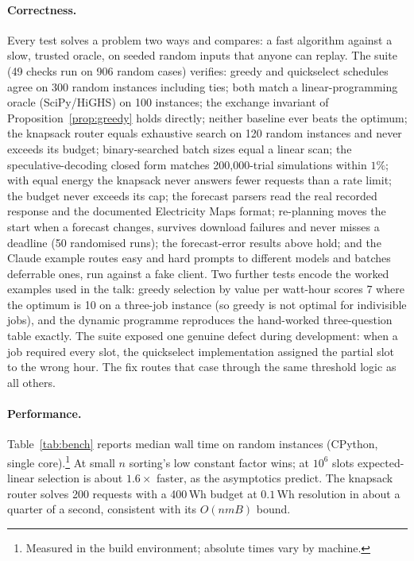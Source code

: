 \documentclass[11pt]{article}
\theoremstyle{definition}
\theoremstyle{remark}
\begin{document}
\paragraph{Correctness.} Every test solves a problem two ways and compares: a fast algorithm against a slow, trusted oracle, on seeded random inputs that anyone can replay. The suite (49 checks run on 906 random cases) verifies: greedy and quickselect schedules agree on 300 random instances including ties; both match a linear-programming oracle (SciPy/HiGHS) on 100 instances; the exchange invariant of Proposition~\ref{prop:greedy} holds directly; neither baseline ever beats the optimum; the knapsack router equals exhaustive search on 120 random instances and never exceeds its budget; binary-searched batch sizes equal a linear scan; the speculative-decoding closed form matches 200{,}000-trial simulations within $1\%$; with equal energy the knapsack never answers fewer requests than a rate limit; the budget never exceeds its cap; the forecast parsers read the real recorded response and the documented Electricity Maps format; re-planning moves the start when a forecast changes, survives download failures and never misses a deadline (50 randomised runs); the forecast-error results above hold; and the Claude example routes easy and hard prompts to different models and batches deferrable ones, run against a fake client. Two further tests encode the worked examples used in the talk: greedy selection by value per watt-hour scores 7 where the optimum is 10 on a three-job instance (so greedy is not optimal for indivisible jobs), and the dynamic programme reproduces the hand-worked three-question table exactly. The suite exposed one genuine defect during development: when a job required every slot, the quickselect implementation assigned the partial slot to the wrong hour. The fix routes that case through the same threshold logic as all others.

\paragraph{Performance.} Table~\ref{tab:bench} reports median wall time on random instances (CPython, single core).\footnote{Measured in the build environment; absolute times vary by machine.} At small $n$ sorting's low constant factor wins; at $10^6$ slots expected-linear selection is about $1.6\times$ faster, as the asymptotics predict. The knapsack router solves 200 requests with a 400\,Wh budget at $0.1$\,Wh resolution in about a quarter of a second, consistent with its $O(nmB)$ bound.
\end{document}

